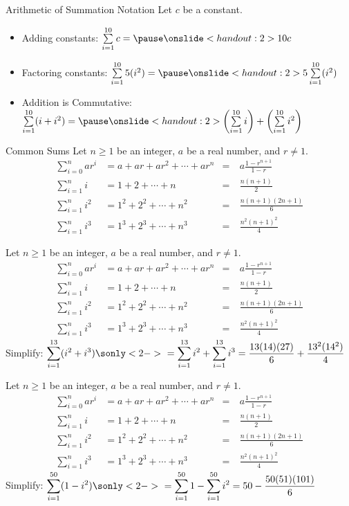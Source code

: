 \begin{frame}{Arithmetic of Summation Notation}
Let $c$ be a constant.\vfill
\begin{itemize}
\item Adding constants: $\sum\limits_{i=1}^{10}c=\pause \onslide<handout:2>{10c}$\pause\vfill
\item Factoring constants: $\sum\limits_{i=1}^{10}5(i^2)=\pause \onslide<handout:2>{5\sum\limits_{i=1}^{10}(i^2)}$\pause\vfill
\item Addition is Commutative: $\sum\limits_{i=1}^{10} (i+i^2)=\pause \onslide<handout:2>{\left(\sum\limits_{i=1}^{10}i\right)+\left(\sum\limits_{i=1}^{10}i^2\right)}$
\end{itemize}
\end{frame}
\newcommand{\sumlist}{Let $n \ge 1$ be an integer, $a$ be a real number, and $r \neq 1$.
\begin{align*}
\sum_{i=0}^n ar^i &= a+ar+ar^2+\cdots +ar^n & =~& a\frac{1-r^{n+1}}{1-r} \\
\sum_{i=1}^n i &= 1+2+\cdots+n&=~&\frac{n(n+1)}{2}\\
\sum_{i=1}^n i^2 &= 1^2+2^2+\cdots+n^2&=~&\frac{n(n+1)(2n+1)}{6}\\
\sum_{i=1}^n i^3 &= 1^3+2^3+\cdots+n^3&=~&\frac{n^2(n+1)^2}{4}
\end{align*}
}
\begin{frame}{Common Sums}
\label{note1.1b}
\sumlist


\end{frame}
\begin{frame}[t]
{\color{W2} \footnotesize \sumlist}
Simplify:
$\ds\sum_{i=1}^{13}(i^2+i^3)\sonly<2->{~=\sum_{i=1}^{13}i^2+\sum_{i=1}^{13}i^3=\frac{13(14)(27)}{6}+\frac{13^2(14^2)}{4}}$

\end{frame}
\begin{frame}[t]
{\color{W2} \footnotesize \sumlist}
Simplify:
$\ds\sum_{i=1}^{50}(1-i^2)\sonly<2->{~=\ds\sum_{i=1}^{50}1-\sum_{i=1}^{50}i^2=50-\frac{50(51)(101)}{6}}$

\end{frame}

